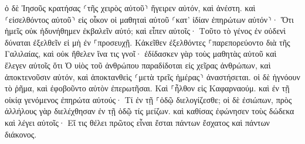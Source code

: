 \documentclass{openreader}
\begin{document}
ὁ δὲ Ἰησοῦς κρατήσας ⸂τῆς χειρὸς αὐτοῦ⸃ ἤγειρεν αὐτόν, καὶ ἀνέστη. 
καὶ ⸂εἰσελθόντος αὐτοῦ⸃ εἰς οἶκον οἱ μαθηταὶ αὐτοῦ ⸂κατ’ ἰδίαν ἐπηρώτων αὐτόν⸃· Ὅτι ἡμεῖς οὐκ ἠδυνήθημεν ἐκβαλεῖν αὐτό; 
καὶ εἶπεν αὐτοῖς· Τοῦτο τὸ γένος ἐν οὐδενὶ δύναται ἐξελθεῖν εἰ μὴ ἐν ⸀προσευχῇ. 
Κἀκεῖθεν ἐξελθόντες ⸀παρεπορεύοντο διὰ τῆς Γαλιλαίας, καὶ οὐκ ἤθελεν ἵνα τις γνοῖ· 
ἐδίδασκεν γὰρ τοὺς μαθητὰς αὐτοῦ καὶ ἔλεγεν αὐτοῖς ὅτι Ὁ υἱὸς τοῦ ἀνθρώπου παραδίδοται εἰς χεῖρας ἀνθρώπων, καὶ ἀποκτενοῦσιν αὐτόν, καὶ ἀποκτανθεὶς ⸂μετὰ τρεῖς ἡμέρας⸃ ἀναστήσεται. 
οἱ δὲ ἠγνόουν τὸ ῥῆμα, καὶ ἐφοβοῦντο αὐτὸν ἐπερωτῆσαι. 
Καὶ ⸀ἦλθον εἰς Καφαρναούμ. καὶ ἐν τῇ οἰκίᾳ γενόμενος ἐπηρώτα αὐτούς· Τί ἐν τῇ ⸀ὁδῷ διελογίζεσθε; 
οἱ δὲ ἐσιώπων, πρὸς ἀλλήλους γὰρ διελέχθησαν ἐν τῇ ὁδῷ τίς μείζων. 
καὶ καθίσας ἐφώνησεν τοὺς δώδεκα καὶ λέγει αὐτοῖς· Εἴ τις θέλει πρῶτος εἶναι ἔσται πάντων ἔσχατος καὶ πάντων διάκονος. 
\end{document}
